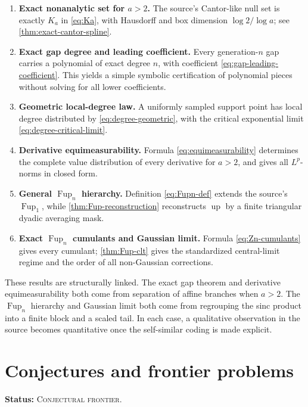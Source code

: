 \documentclass[11pt]{article}
\theoremstyle{definition}
\theoremstyle{remark}
\newcommand{\Up}{\operatorname{up}}
\newcommand{\Fup}{\operatorname{Fup}}
\newcommand{\FrontierStatus}{\textcolor{FrontierRed}{\textsc{Conjectural frontier}}}
\newcommand{\status}[1]{\par\smallskip\noindent\textbf{Status:} #1.\par\smallskip}
\begin{document}
\begin{enumerate}[label=\textbf{R\arabic*.}]
  \item \textbf{Exact nonanalytic set for \(a>2\).}  The source's Cantor-like null set is exactly \(K_a\) in \eqref{eq:Ka}, with Hausdorff and box dimension \(\log2/\log a\); see \cref{thm:exact-cantor-spline}.

  \item \textbf{Exact gap degree and leading coefficient.}  Every generation-\(n\) gap carries a polynomial of exact degree \(n\), with coefficient \eqref{eq:gap-leading-coefficient}.  This yields a simple symbolic certification of polynomial pieces without solving for all lower coefficients.

  \item \textbf{Geometric local-degree law.}  A uniformly sampled support point has local degree distributed by \eqref{eq:degree-geometric}, with the critical exponential limit \eqref{eq:degree-critical-limit}.

  \item \textbf{Derivative equimeasurability.}  Formula \eqref{eq:equimeasurability} determines the complete value distribution of every derivative for \(a>2\), and gives all \(L^p\)-norms in closed form.

  \item \textbf{General \(\Fup_n\) hierarchy.}  Definition \eqref{eq:Fupn-def} extends the source's \(\Fup_1\), while \cref{thm:Fup-reconstruction} reconstructs \(\Up\) by a finite triangular dyadic averaging mask.

  \item \textbf{Exact \(\Fup_n\) cumulants and Gaussian limit.}  Formula \eqref{eq:Zn-cumulants} gives every cumulant; \cref{thm:Fup-clt} gives the standardized central-limit regime and the order of all non-Gaussian corrections.
\end{enumerate}

These results are structurally linked.  The exact gap theorem and derivative equimeasurability both come from separation of affine branches when \(a>2\).  The \(\Fup_n\) hierarchy and Gaussian limit both come from regrouping the sinc product into a finite block and a scaled tail.  In each case, a qualitative observation in the source becomes quantitative once the self-similar coding is made explicit.

\section{Conjectures and frontier problems}
\label{sec:conjectures}
\status{\FrontierStatus}
\end{document}
